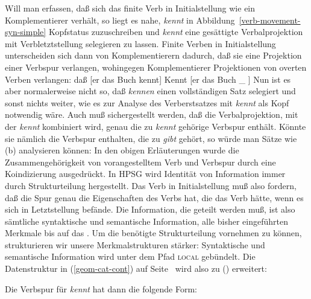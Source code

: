 Will man erfassen, daß sich das finite Verb in Initialstellung wie ein Komplementierer verhält, so liegt
es nahe, \emph{kennt} in Abbildung~\ref{verb-movement-syn-simple} Kopfstatus zuzuschreiben und
\emph{kennt} eine gesättigte Verbalprojektion mit Verbletztstellung selegieren zu lassen.
Finite Verben in Initialstellung unterscheiden sich dann von Komplementierern dadurch,
daß sie eine Projektion einer Verbspur verlangen, wohingegen Komplementierer Projektionen
von overten Verben verlangen:
\eal
\ex daß [er das Buch kennt]
\ex Kennt [er das Buch \_ ]
\zl
Nun ist es aber normalerweise nicht so, daß \emph{kennen}
einen vollständigen Satz selegiert und sonst nichts weiter, wie es zur Analyse des Verberstsatzes
mit \emph{kennt} als Kopf notwendig wäre. Auch muß sichergestellt werden, daß die Verbalprojektion,
mit der \emph{kennt} kombiniert wird, genau die zu \emph{kennt} gehörige Verbspur enthält. Könnte
sie nämlich die Verbspur enthalten, die zu \emph{gibt} gehört, so würde man Sätze wie (b)
analysieren können:
\eal
{}
\zl
In den obigen Erläuterungen wurde die Zusammengehörigkeit von vorangestelltem Verb und Verbspur
durch eine Koindizierung ausgedrückt. In HPSG wird Identität von Information immer durch Strukturteilung
hergestellt. Das Verb in Initialstellung muß also fordern, daß die Spur genau die Eigenschaften des
Verbs hat, die das Verb hätte, wenn es sich in Letztstellung befände. Die Information, die geteilt
werden muß, ist also sämtliche syntaktische und semantische Information, \dash alle bisher eingeführten
Merkmale bis auf das \phonm. Um die benötigte Strukturteilung vornehmen zu können, strukturieren
wir unsere Merkmalstrukturen stärker: Syntaktische und semantische Information wird unter dem
Pfad \textsc{local} gebündelt. Die Datenstruktur in (\ref{geom-cat-cont}) auf Seite~\pageref{geom-cat-cont}
wird also zu () erweitert:
\ea
\label{geom-loc}
\z

\noindent
Die Verbspur für \emph{kennt} hat dann die folgende Form:

